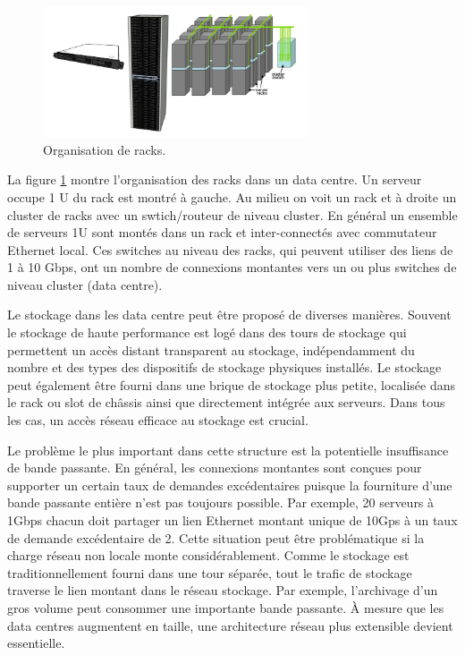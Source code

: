 \begin{figure}[h]
\begin{center}
\includegraphics[width=0.7\textwidth]{images/racks} 
\caption{Organisation de racks. \cite{datacenterAsComputerIntro}}\label{racks}
\end{center}
\end{figure}

La figure \ref{racks} montre l'organisation des racks dans un data centre. Un serveur occupe 1 U du rack est montré à gauche. Au milieu on voit un rack et à droite un cluster de racks avec un swtich/routeur de niveau cluster. En général un ensemble de serveurs 1U sont montés dans un rack et inter-connectés avec commutateur Ethernet local. Ces switches au niveau des racks, qui peuvent utiliser des liens de 1 à 10 Gbps, ont un nombre de connexions montantes vers un ou plus switches de niveau cluster (data centre).

Le stockage dans les data centre peut être proposé de diverses manières. Souvent le stockage de haute performance est logé dans des \og  tours de stockage \fg{} qui permettent un accès distant transparent au stockage, indépendamment du nombre et des types des dispositifs de stockage physiques installés. Le stockage peut également être fourni dans une \og  brique de stockage \fg{} plus petite, localisée dans le rack ou slot de châssis ainsi que directement intégrée aux serveurs. Dans tous les cas, un accès réseau efficace au stockage est crucial.

Le problème le plus important dans cette structure est la potentielle insuffisance de bande passante. En général, les connexions montantes sont conçues pour supporter un certain taux de demandes excédentaires puisque la fourniture d'une bande passante entière n'est pas toujours possible. Par exemple, 20 serveurs à 1Gbps chacun doit partager un lien Ethernet montant unique de 10Gps à un taux de demande excédentaire de 2. Cette situation peut être problématique si la charge réseau non locale monte considérablement. Comme le stockage est traditionnellement fourni dans une tour séparée, tout le trafic de stockage traverse le lien montant dans le réseau stockage. Par exemple, l'archivage d'un gros volume peut consommer une importante bande passante. À mesure que les data centres augmentent en taille, une architecture réseau plus extensible devient essentielle.

